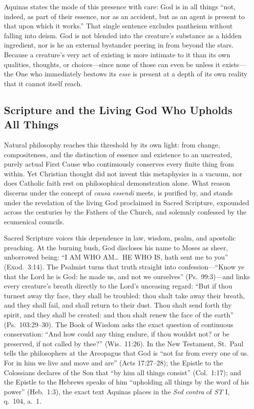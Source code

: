 Aquinas states the mode of this presence with care: God is in all things ``not, indeed, as part of their essence, nor as an accident, but as an agent is present to that upon which it works.'' That single sentence excludes pantheism without falling into deism. God is not blended into the creature's substance as a hidden ingredient, nor is he an external bystander peering in from beyond the stars. Because a creature's very act of existing is more intimate to it than its own qualities, thoughts, or choices---since none of those can even be unless it exists---the One who immediately bestows its \emph{esse} is present at a depth of its own reality that it cannot itself reach.

\subsection{Scripture and the Living God Who Upholds All Things}

Natural philosophy reaches this threshold by its own light: from change, compositeness, and the distinction of essence and existence to an uncreated, purely actual First Cause who continuously conserves every finite thing from within. Yet Christian thought did not invent this metaphysics in a vacuum, nor does Catholic faith rest on philosophical demonstration alone. What reason discerns under the concept of \emph{causa essendi} meets, is purified by, and stands under the revelation of the living God proclaimed in Sacred Scripture, expounded across the centuries by the Fathers of the Church, and solemnly confessed by the ecumenical councils.

Sacred Scripture voices this dependence in law, wisdom, psalm, and apostolic preaching. At the burning bush, God discloses his name to Moses as sheer, unborrowed being: ``I AM WHO AM\dots\ HE WHO IS, hath sent me to you'' (Exod.\ 3:14). The Psalmist turns that truth straight into confession---``Know ye that the Lord he is God: he made us, and not we ourselves'' (Ps.\ 99:3)---and links every creature's breath directly to the Lord's unceasing regard: ``But if thou turnest away thy face, they shall be troubled: thou shalt take away their breath, and they shall fail, and shall return to their dust. Thou shalt send forth thy spirit, and they shall be created: and thou shalt renew the face of the earth'' (Ps.\ 103:29--30). The Book of Wisdom asks the exact question of continuous conservation: ``And how could any thing endure, if thou wouldst not? or be preserved, if not called by thee?'' (Wis.\ 11:26). In the New Testament, St.\ Paul tells the philosophers at the Areopagus that God is ``not far from every one of us. For in him we live and move and are'' (Acts 17:27--28); the Epistle to the Colossians declares of the Son that ``by him all things consist'' (Col.\ 1:17); and the Epistle to the Hebrews speaks of him ``upholding all things by the word of his power'' (Heb.\ 1:3), the exact text Aquinas places in the \emph{Sed contra} of \emph{ST} I, q.\ 104, a.\ 1.

